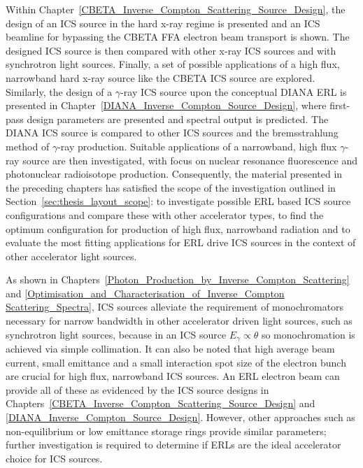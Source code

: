 \documentclass[../main.tex]{subfiles}
\begin{document}
Within Chapter~\ref{CBETA_Inverse_Compton_Scattering_Source_Design}, the design of an ICS source in the hard x-ray regime is presented and an ICS beamline for bypassing the CBETA FFA electron beam transport is shown. The designed ICS source is then compared with other x-ray ICS sources and with synchrotron light sources. Finally, a set of possible applications of a high flux, narrowband hard x-ray source like the CBETA ICS source are explored. Similarly, the design of a $\gamma$-ray ICS source upon the conceptual DIANA ERL is presented in Chapter~\ref{DIANA_Inverse_Compton_Source_Design}, where first-pass design parameters are presented and spectral output is predicted. The DIANA ICS source is compared to other ICS sources and the bremsstrahlung method of $\gamma$-ray production. Suitable applications of a narrowband, high flux $\gamma$-ray source are then investigated, with focus on nuclear resonance fluorescence and photonuclear radioisotope production. Consequently, the material presented in the preceding chapters has satisfied the scope of the investigation outlined in Section~\ref{sec:thesis_layout_scope}: to investigate possible ERL based ICS source configurations and compare these with other accelerator types, to find the optimum configuration for production of high flux, narrowband radiation and to evaluate the most fitting applications for ERL drive ICS sources in the context of other accelerator light sources.

As shown in Chapters~\ref{Photon_Production_by_Inverse_Compton_Scattering} and \ref{Optimisation_and_Characterisation_of_Inverse_Compton Scattering_Spectra}, ICS sources alleviate the requirement of monochromators necessary for narrow bandwidth in other accelerator driven light sources, such as synchrotron light sources, because in an ICS source $E_{\gamma} \propto \theta$ so monochromation is achieved via simple collimation. It can also be noted that high average beam current, small emittance and a small interaction spot size of the electron bunch are crucial for high flux, narrowband ICS sources. An ERL electron beam can provide all of these as evidenced by the ICS source designs in Chapters~\ref{CBETA_Inverse_Compton_Scattering_Source_Design} and \ref{DIANA_Inverse_Compton_Source_Design}. However, other approaches such as non-equilibrium or low emittance storage rings provide similar parameters; further investigation is required to determine if ERLs are the ideal accelerator choice for ICS sources. 
\end{document}
